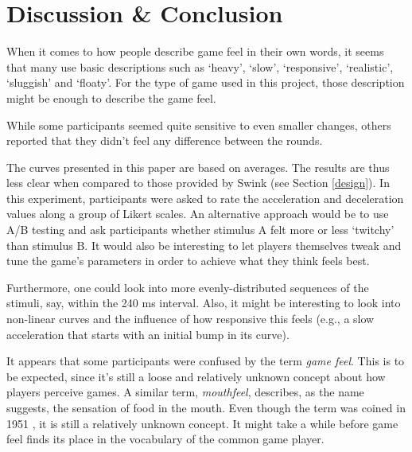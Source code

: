\section{Discussion \& Conclusion} \label{discussion}
When it comes to how people describe game feel in their own words, it seems that many use basic descriptions such as `heavy', `slow', `responsive', `realistic', `sluggish' and `floaty'. For the type of game used in this project, those description might be enough to describe the game feel.


While some participants seemed quite sensitive to even smaller changes, others reported that they didn't feel any difference between the rounds.

The curves presented in this paper are based on averages. The results are thus less clear when compared to those provided by Swink (see Section \ref{design}). In this experiment, participants were asked to rate the acceleration and deceleration values along a group of Likert scales. An alternative approach would be to use A/B testing and ask participants whether stimulus A felt more or less `twitchy' than stimulus B. It would also be interesting to let players themselves tweak and tune the game's parameters in order to achieve what they think feels best.

Furthermore, one could look into more evenly-distributed sequences of the stimuli, say, within the 240 ms interval. Also, it might be interesting to look into non-linear curves and the influence of how responsive this feels (e.g., a slow acceleration that starts with an initial bump in its curve).

It appears that some participants were confused by the term \textit{game feel}. This is to be expected, since it's still a loose and relatively unknown concept about how players perceive games. A similar term, \textit{mouthfeel}, describes, as the name suggests, the sensation of food in the mouth. Even though the term was coined in 1951 \cite{mouthfeel}, it is still a relatively unknown concept. It might take a while before game feel finds its place in the vocabulary of the common game player.


